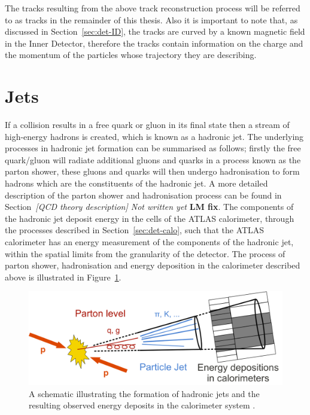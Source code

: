The tracks resulting from the above track reconstruction process will be referred to as tracks in the remainder of this thesis.
Also it is important to note that, as discussed in Section~\ref{sec:det-ID}, the tracks are curved by a known magnetic field in the Inner Detector,
therefore the tracks contain information on the charge and the momentum of the particles whose trajectory they are describing.

\section{Jets}
\label{sec:obj-jets}

If a collision results in a free quark or gluon in its final state then a stream of high-energy hadrons is created,
which is known as a hadronic jet.
The underlying processes in hadronic jet formation can be summarised as follows;
firstly the free quark/gluon will radiate additional gluons and quarks in a process known as the parton shower,
these gluons and quarks will then undergo hadronisation to form hadrons which are the constituents of the hadronic jet.
A more detailed description of the parton shower and hadronisation process can be found in Section~\textit{[QCD theory description] Not written yet} \textbf{LM fix}.
The components of the hadronic jet deposit energy in the cells of the ATLAS calorimeter, through the processes described in Section~\ref{sec:det-calo},
such that the ATLAS calorimeter has an energy measurement of the components of the hadronic jet, within the spatial limits from the granularity of the detector.
The process of parton shower, hadronisation and energy deposition in the calorimeter  described above is illustrated in Figure~\ref{fig:obj-jets_schem}.

\begin{figure}[!ht]
  \begin{center}
    \includegraphics[width=0.8\linewidth, angle=0]{figs/Objects/jets_schem.png}
  \end{center}
  \caption[A schematic illustrating the formation of hadronic jets and the resulting observed energy deposits in the calorimeter system.]
          {A schematic illustrating the formation of hadronic jets and the resulting observed energy deposits in the calorimeter system \cite{obj-jets_schem}.}
  \label{fig:obj-jets_schem}
\end{figure}

